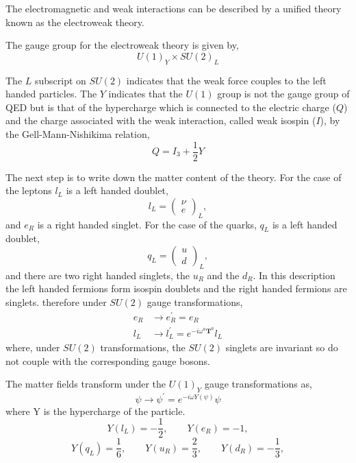 The electromagnetic and weak interactions can be described by a unified theory
known as the electroweak theory.

The gauge group for the electroweak theory is given by,
\begin{equation}
U(1)_{Y} \times SU(2)_{L} 
\end{equation}

The $L$ subscript on $SU(2)$ indicates that the weak force couples to the left
handed particles. 
The $Y$ indicates that the $U(1)$ group is not the gauge
group of QED but is that of the hypercharge which is connected to the electric
charge ($Q$) and the charge associated with the weak interaction, called weak
isospin ($I$), by the Gell-Mann-Nishikima relation,
\begin{equation}
Q = I_{3}+ \frac{1}{2}Y
\end{equation}

The next step is to write down the matter content of the theory. 
For the case of the leptons $l_{L}$ is a left
handed doublet,
\begin{equation}
l_{L} = \left( \begin{matrix} \nu \\ e \end{matrix} \right)_{L},
\end{equation}
and $e_{R}$ is a right handed singlet.
For the case of the quarks, $q_{L}$ is a left handed doublet,
\begin{equation}
q_{L} = \left( \begin{matrix} u\\ d \end{matrix} \right)_{L},
\end{equation}
and there are two right handed singlets, the $u_{R}$ and the $d_{R}$.
In this
description the left handed fermions form isospin doublets and the right
handed fermions are singlets. 
therefore under $SU(2)$ gauge transformations,
\begin{align}
e_{R} &\to e_{R}^{\prime} = e_{R}\\
l_{L} &\to l_{L}^{\prime} = e^{-i \omega^{a} \mathbf{T}^{a} }l_{L}
\end{align}
where, under $SU(2)$ transformations, the $SU(2)$ singlets are invariant so do
not couple with the corresponding gauge bosons.

The matter fields transform under the $U(1)_Y$ gauge transformations as,
\begin{equation}
\psi \to \psi^{\prime} = e^{-i\omega Y(\psi)}\psi
\end{equation}
where Y is the hypercharge of the particle.
\begin{equation}
Y(l_{L}) = -\frac{1}{2}, \qquad Y(e_{R}) = -1,
\end{equation}
\begin{equation}
Y(q_{L}) =  \frac{1}{6}, \qquad Y(u_{R}) =  \frac{2}{3}, \qquad Y(d_{R}) = -\frac{1}{3},
\end{equation}

